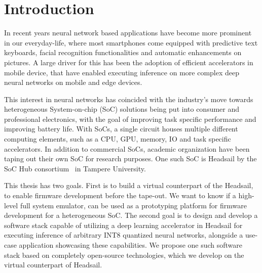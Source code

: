 \documentclass[12pt,a4paper,english
]{tunithesis}
\begin{document}
\thispagestyle{empty}
\listoffigures
\listoftables
\clearpage


\if@twoside
\cleardoublepage
\fi


\renewcommand{\chaptername}{} %


\chapter{Introduction}
\label{ch:introduction}
\setcounter{page}{1} %

In recent years neural network based applications have become more prominent in our everyday-life, where most smartphones come equipped with predictive text keyboards, facial recognition functionalities and automatic enhancements on pictures. A large driver for this has been the adoption of efficient accelerators in mobile device, that have enabled executing inference on more complex deep neural networks on mobile and edge devices.

This interest in neural networks has coincided with the industry's move towards heterogeneous System-on-chip (SoC) solutions being put into consumer and professional electronics, with the goal of improving task specific performance and improving battery life. With SoCs, a single circuit houses multiple different computing elements, such as a CPU, GPU, memory, IO and task specific accelerators.
In addition to commercial SoCs, academic organization have been taping out their own SoC for research purposes. One such SoC is Headsail by the SoC Hub consortium~\cite{keelhaul} in Tampere University.

This thesis has two goals. First is to build a virtual counterpart of the Headsail, to enable firmware development before the tape-out. We want to know if a high-level full system emulator, can be used as a prototyping platform for firmware development for a heterogeneous SoC.
The second goal is to design and develop a software stack capable of utilizing a deep learning accelerator in Headsail for executing inference of arbitrary INT8 quantized neural networks, alongside a use-case application showcasing these capabilities. We propose one such software stack based on completely open-source technologies, which we develop on the virtual counterpart of Headsail.
\end{document}
